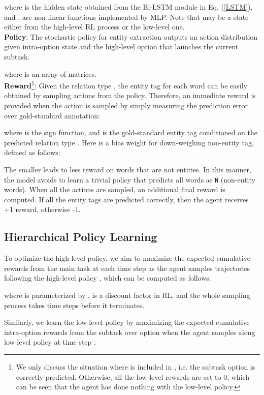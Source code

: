 \documentclass[letterpaper]{article} \usepackage{aaai19}  \usepackage{times}  \usepackage{helvet}  \usepackage{courier}  \usepackage{url}  \usepackage{graphicx}  \frenchspacing  \setlength{\pdfpagewidth}{8.5in}  \setlength{\pdfpageheight}{11in}  \usepackage{amsfonts}
\theoremstyle{definition}
\begin{document}
where  is the hidden state obtained from the Bi-LSTM module in Eq. (\ref{LSTM}), and ,  are non-linear functions implemented by MLP. 
Note that  may be a state either from the high-level RL process or the low-level one.
\\
\textbf{Policy}: The stochastic policy for entity extraction  outputs an action distribution given intra-option state  and the high-level option  that launches the current subtask. 

where  is an array of  matrices.
\\
\textbf{Reward}\footnote{We only discuss the situation where  is included in , i.e. the subtask option  is correctly predicted. Otherwise, all the low-level rewards are set to 0, which can be seen that the agent has done nothing with the low-level policy.}: Given the relation type , the entity tag for each word can be easily obtained by sampling actions from the policy. Therefore, an immediate reward  is provided when the action  is sampled by simply measuring the prediction error over gold-standard annotation:

where  is the sign function, and  is the gold-standard entity tag conditioned on the predicted relation type . Here  is a bias weight for down-weighing non-entity tag, defined as follows:

The smaller  leads to less reward on words that are not entities. In this manner, the model avoids to learn a trivial policy that predicts all words as \texttt{N} (non-entity words).
When all the actions are sampled, an additional final reward  is computed. If all the entity tags are predicted correctly, then the agent receives +1 reward, otherwise -1. 


\subsection{Hierarchical Policy Learning}


To optimize the high-level policy, we aim to maximize the expected cumulative rewards from the main task at each time step  as the agent samples trajectories following the high-level policy , which can be computed as follows: 

where  is parameterized by ,  is a discount factor in RL, and the whole sampling process  takes  time steps before it terminates. 


Similarly, we learn the low-level policy by maximizing the expected cumulative intra-option rewards from the subtask over option  when the agent samples along low-level policy  at time step :
\end{document}
